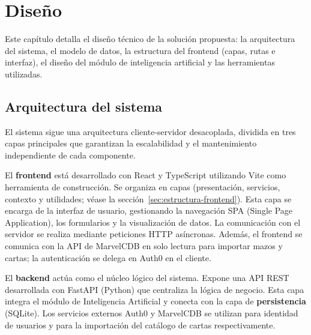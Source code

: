 
\chapter{Diseño}
\label{chap:diseno}

Este capítulo detalla el diseño técnico de la solución propuesta: la arquitectura del sistema, el modelo de datos, la estructura del frontend (capas, rutas e interfaz), el diseño del módulo de inteligencia artificial y las herramientas utilizadas.

\section{Arquitectura del sistema}

El sistema sigue una arquitectura cliente-servidor desacoplada, dividida en tres capas principales que garantizan la escalabilidad y el mantenimiento independiente de cada componente.

El \textbf{frontend} está desarrollado con React y TypeScript utilizando Vite como herramienta de construcción. Se organiza en capas (presentación, servicios, contexto y utilidades; véase la sección~\ref{sec:estructura-frontend}). Esta capa se encarga de la interfaz de usuario, gestionando la navegación SPA (Single Page Application), los formularios y la visualización de datos. La comunicación con el servidor se realiza mediante peticiones HTTP asíncronas. Además, el frontend se comunica con la API de MarvelCDB en solo lectura para importar mazos y cartas; la autenticación se delega en Auth0 en el cliente.

El \textbf{backend} actúa como el núcleo lógico del sistema. Expone una API REST desarrollada con FastAPI (Python) que centraliza la lógica de negocio. Esta capa integra el módulo de Inteligencia Artificial y conecta con la capa de \textbf{persistencia} (SQLite). Los servicios externos Auth0 y MarvelCDB se utilizan para identidad de usuarios y para la importación del catálogo de cartas respectivamente.


